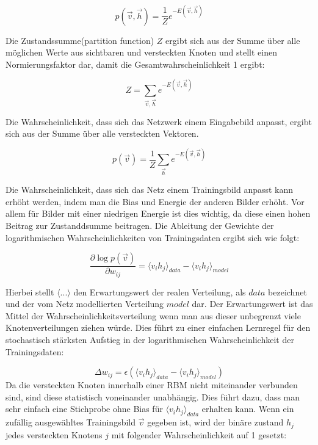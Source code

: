 \documentclass[12pt]{article}
\begin{document}
\begin{equation}
p(\vec{v},\vec{h})= \frac{1}{Z} e^{-E(\vec{v},\vec{h})}
\end{equation}

Die Zustandssumme(partition function) $Z$ ergibt sich aus der Summe über alle möglichen Werte aus sichtbaren und versteckten Knoten und stellt einen Normierungsfaktor dar, damit die Gesamtwahrscheinlichkeit 1 ergibt:

\begin{equation}
Z=\sum_{\vec{v},\vec{h}} e^{-E(\vec{v},\vec{h})}
\end{equation}

Die Wahrscheinlichkeit, dass sich das Netzwerk einem Eingabebild anpasst, ergibt sich aus der Summe über alle versteckten Vektoren. \cite{guide}

\begin{equation}
p(\vec{v})= \frac{1}{Z} \sum_{\vec{h}} e^{-E(\vec{v},\vec{h})}
\end{equation}

Die Wahrscheinlichkeit, dass sich das Netz einem Trainingsbild anpasst kann erhöht werden, indem man die Bias und Energie der anderen Bilder erhöht. Vor allem für Bilder mit einer niedrigen Energie ist dies wichtig, da diese einen hohen Beitrag zur Zustanddsumme beitragen. Die Ableitung der Gewichte der logarithmischen Wahrscheinlichkeiten von Trainingsdaten ergibt sich wie folgt:

\begin{equation}
\frac{\partial \log p(\vec{v})}{\partial w_{ij}} = \langle v_ih_j \rangle_{data} - \langle v_i h_j \rangle_{model}
\end{equation}

Hierbei stellt $\langle...\rangle$ den Erwartungswert der realen Verteilung, als $data$ bezeichnet und der vom Netz modellierten Verteilung $model$ dar. Der Erwartungswert ist das Mittel der Wahrscheinlichkeitsverteilung wenn man aus dieser unbegrenzt viele Knotenverteilungen ziehen würde. Dies führt zu einer einfachen Lernregel für den stochastisch stärksten Aufstieg in der logarithmischen Wahrscheinlichkeit der Trainingsdaten:

\begin{equation}
\Delta w_{ij} = \epsilon\left( \langle v_i h_j \rangle_{data} - \langle v_i h_j \rangle_{model} \right)
\end{equation}
Da die versteckten Knoten innerhalb einer RBM nicht miteinander verbunden sind, sind diese statistisch voneinander unabhängig. Dies führt dazu, dass man sehr einfach eine Stichprobe ohne Bias für $\langle v_i h_j \rangle_{data}$ erhalten kann. Wenn ein zufällig ausgewähltes Trainingsbild $\vec{v}$ gegeben ist, wird der binäre zustand $h_j$ jedes versteckten Knotens $j$ mit folgender Wahrscheinlichkeit auf 1 gesetzt:
\end{document}
